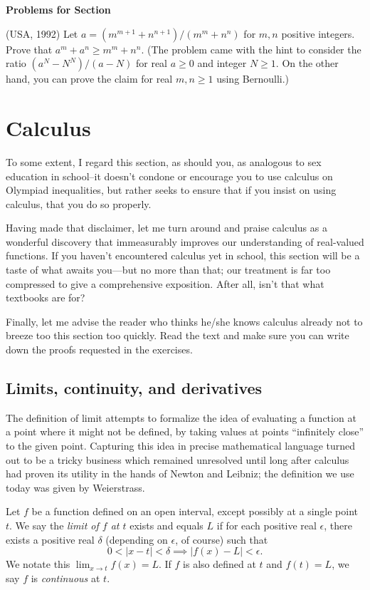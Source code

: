 \documentclass[12pt]{report}
\def\ii{\item}
\newcounter{exc}
\numberwithin{exc}{section}
\newenvironment{exer}{\vspace{0.1in}
\noindent \textbf{Problems for Section~\thesection} \vspace{0.1in}
\begin{list}{\arabic{exc}.}{\usecounter{exc}}}{\end{list}}
\begin{document}
\begin{exer}
\ii (USA, 1992)
Let $a = (m^{m+1}+n^{n+1})/(m^m+n^n)$ for $m,n$ positive integers. Prove that
$a^m + a^n \geq m^m + n^n$. (The problem came with the hint to consider
the ratio $(a^N-N^N)/(a-N)$ for real $a \geq 0$ and integer $N \geq 1$.
On the other hand, you can prove the claim for real $m,n \geq 1$
using Bernoulli.)
\end{exer}

\chapter{Calculus} \label{chap:calc}
To some extent, I regard this section, as should you, as analogous to sex 
education in school--it doesn't condone or encourage you to use calculus on 
Olympiad inequalities, but rather seeks to ensure that if you insist 
on using calculus, that you do so properly.

Having made that disclaimer, let me turn around and praise calculus as 
a wonderful discovery that immeasurably improves our understanding of 
real-valued functions. If you haven't encountered calculus yet in 
school, this section will be a taste of what awaits you---but no more 
than that; our treatment is far too compressed to give a 
comprehensive exposition. After all, isn't that what textbooks are for? 

Finally, let me advise the reader who thinks he/she knows calculus
already not to breeze too this section too quickly. Read the text and
make sure you can write down the proofs requested in the exercises.

\section{Limits, continuity, and derivatives}
The definition of limit attempts to formalize the idea of evaluating a 
function at a point where it might not be defined, by taking values at 
points ``infinitely close'' to the given point. Capturing this idea 
in precise mathematical language turned out to be a tricky business 
which remained unresolved until long after calculus had proven its 
utility in the hands of Newton and Leibniz; the definition we use 
today was given by Weierstrass.

Let $f$ be a function defined on an open interval, except possibly at 
a single point $t$. We say the \emph{limit of $f$ at $t$} exists 
and equals $L$ if for each positive real $\epsilon$, there exists a 
positive real $\delta$ (depending on $\epsilon$, of course) such that
\[
0< |x - t| < \delta \implies |f(x) - L| <\epsilon.
\]
We notate this $\lim_{x\to t}f(x) = L$.
If $f$ is also defined at $t$ and $f(t) = L$, we say $f$ is 
\emph{continuous} at $t$.
\end{document}
